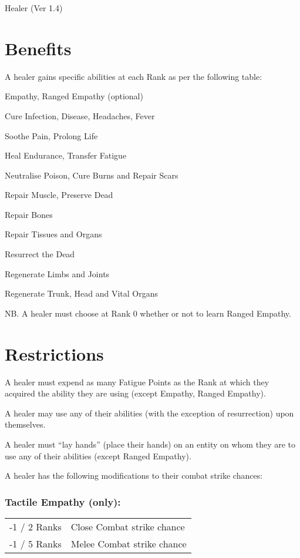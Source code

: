 \begin{Chapter}{Healer (Ver 1.4)}
\section{Benefits}

A healer gains specific abilities at each Rank as per 
the following table: 
\begin{Enumerate}\setcounter{enumi}{-1}
\item Empathy, Ranged Empathy (optional) 
\item Cure Infection, Disease, Headaches, Fever 
\item Soothe Pain, Prolong Life 
\item Heal Endurance, Transfer Fatigue 
\item Neutralise Poison, Cure Burns and Repair Scars 
\item Repair Muscle, Preserve Dead 
\item Repair Bones 
\item Repair Tissues and Organs 
\item Resurrect the Dead 
\item Regenerate Limbs and Joints 
\item Regenerate Trunk, Head and Vital Organs 
\end{Enumerate}

NB.  A healer must choose at Rank 0 whether or not to learn Ranged
Empathy.

\section{Restrictions}

A healer must expend as many Fatigue Points as the Rank at which they
acquired the ability they are using (except Empathy, Ranged Empathy).

A healer may use any of their abilities (with the exception of
resurrection) upon themselves.

A healer must “lay hands” (place their hands) on an entity on whom
they are to use any of their abilities (except Ranged Empathy).

A healer has the following modifications to their combat strike
chances:

\subsubsection{Tactile Empathy (only):}

\begin{tabularx}{\columnwidth}{ll}
-1 / 2 Ranks	& Close Combat strike chance \\
-1 / 5 Ranks	& Melee Combat strike chance \\
\end{tabularx}


\end{Chapter}
